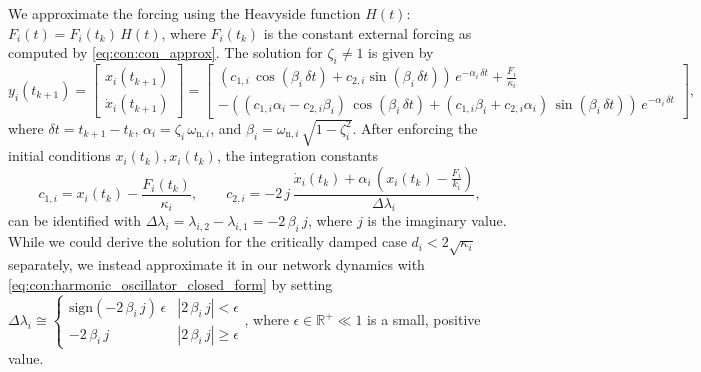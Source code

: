  We approximate the forcing using the Heavyside function $H(t)$: $F_i(t) = F_{i}(t_k) \, H(t)$, where $F_{i}(t_k)$ is the constant external forcing as computed by \eqref{eq:con:con_approx}. The solution for $\zeta_i \neq 1$ is given by~\citep{Pas2023damped}
\begin{equation}\label{eq:con:harmonic_oscillator_closed_form}
    y_i (t_{k+1}) 
    = \begin{bmatrix}
        x_i(t_{k+1})\\
        \dot{x}_i(t_{k+1})
    \end{bmatrix} 
    = \begin{bmatrix}
        \left ( c_{1,i} \, \cos(\beta_i \, \delta t) +  c_{2,i} \sin(\beta_i \, \delta t) \right ) \, e^{-\alpha_i \, \delta t} + \frac{F_{i}}{\kappa_i}\\
        -\left ( (c_{1,i} \alpha_i - c_{2,i} \beta_i) \, \cos(\beta_i \, \delta t) +  (c_{1,i} \beta_i + c_{2,i} \alpha_i) \, \sin(\beta_i \, \delta t) \right ) \, e^{-\alpha_i \, \delta t}
    \end{bmatrix},
\end{equation}
where $\delta t = t_{k+1} - t_k$, $\alpha_i = \zeta_i \, \omega_{\mathrm{n},i}$, and $\beta_i = \omega_{\mathrm{n},i} \, \sqrt{1-\zeta_i^2}$.
After enforcing the initial conditions $x_i(t_k), x_i(t_k)$, the integration constants
\begin{equation}
    c_{1,i} = x_i(t_k) - \frac{F_{i}(t_k)}{\kappa_i},
    \qquad
    c_{2,i} = - 2 \, j \, \frac{\dot{x}_i(t_k) + \alpha_i \, \left (x_i(t_k) - \frac{F_{i}}{k_i} \right )}{\Delta \lambda_i},
\end{equation}
can be identified with $\Delta \lambda_i = \lambda_{i,2} - \lambda_{i,1} = - 2 \, \beta_i \, j$, where $j$ is the imaginary value.
While we could derive the solution for the critically damped case $d_i < 2 \sqrt{\kappa_i}$ separately, we instead approximate it in our network dynamics with \eqref{eq:con:harmonic_oscillator_closed_form} by setting
$\Delta \lambda_i \cong \begin{cases}
    \mathrm{sign}(-2 \, \beta_i \, j) \, \epsilon   & |2 \, \beta_i \, j| < \epsilon \\
    - 2 \, \beta_i \, j & |2 \, \beta_i \, j| \geq \epsilon
\end{cases}$, where $\epsilon \in \mathbb{R}^+ \ll 1$ is a small, positive value.

